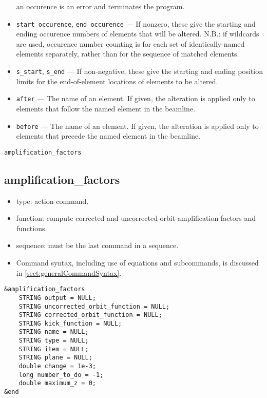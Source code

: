 \documentclass[11pt]{article}
\begin{document}
\begin{itemize}
        an occurence is an error and terminates the program.
\item \verb|start_occurence|, \verb|end_occurence| --- If nonzero, these give the starting and
 ending occurence numbers of elements that will be altered.  N.B.: if wildcards are used, occurence
 number counting is for each set of identically-named elements separately, rather than for the sequence
 of matched elements.
\item \verb|s_start|, \verb|s_end| --- If non-negative, these give the starting and ending position
 limits for the end-of-element locations of elements to be altered.
\item \verb|after| --- The name of an element.  If given, the alteration is applied only to elements
 that follow the named element in the beamline.  
\item \verb|before| --- The name of an element.  If given, the alteration is applied only to elements
 that precede the named element in the beamline. 
\end{itemize}

\newpage
\begin{center}{\Large\verb|amplification_factors|}\end{center}
\subsection{amplification\_factors \label{subsec:amplificationfactors}}

\begin{itemize}
\item type: action command.
\item function: compute corrected and uncorrected orbit amplification factors and functions.
\item sequence: must be the last command in a sequence.
\item Command syntax, including use of equations and subcommands, is discussed in \ref{sect:generalCommandSyntax}.
\end{itemize}

\begin{verbatim}
&amplification_factors
    STRING output = NULL;
    STRING uncorrected_orbit_function = NULL;
    STRING corrected_orbit_function = NULL;
    STRING kick_function = NULL;
    STRING name = NULL;
    STRING type = NULL;
    STRING item = NULL;
    STRING plane = NULL;
    double change = 1e-3;
    long number_to_do = -1;
    double maximum_z = 0;
&end
\end{verbatim}
\end{document}
